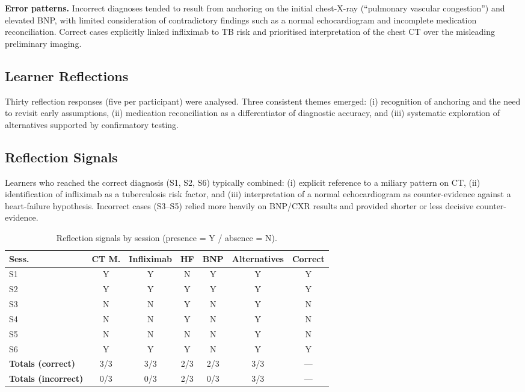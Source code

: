 \noindent
\textbf{Error patterns.}
Incorrect diagnoses tended to result from anchoring on the initial chest-X-ray
(``pulmonary vascular congestion'') and elevated BNP, with limited consideration of
contradictory findings such as a normal echocardiogram and incomplete medication
reconciliation.  
Correct cases explicitly linked infliximab to TB risk and prioritised interpretation of
the chest CT over the misleading preliminary imaging.

\subsection{Learner Reflections}

Thirty reflection responses (five per participant) were analysed.  
Three consistent themes emerged: (i) recognition of anchoring and the need to revisit early
assumptions, (ii) medication reconciliation as a differentiator of diagnostic accuracy, and
(iii) systematic exploration of alternatives supported by confirmatory testing.

\subsection{Reflection Signals}

Learners who reached the correct diagnosis (S1, S2, S6) typically combined:
(i) explicit reference to a miliary pattern on CT,
(ii) identification of infliximab as a tuberculosis risk factor,
and (iii) interpretation of a normal echocardiogram as counter-evidence against a
heart-failure hypothesis.  
Incorrect cases (S3–S5) relied more heavily on BNP/CXR results and provided shorter or less
decisive counter-evidence.

\begin{table}[h]
\centering
\caption{Reflection signals by session (presence = Y / absence = N).}
\label{tab:reflection_summary}
\setlength{\tabcolsep}{6pt}
\renewcommand{\arraystretch}{1.1}
\begin{tabular}{lccccc c}
\toprule
\textbf{Sess.} &
\textbf{CT M.} &
\textbf{Infliximab} &
\textbf{HF} &
\textbf{BNP} &
\textbf{Alternatives} &
\textbf{Correct} \\
\midrule
S1 & Y & Y & N & Y & Y & Y \\
S2 & Y & Y & Y & Y & Y & Y \\
S3 & N & N & Y & N & Y & N \\
S4 & N & N & Y & N & Y & N \\
S5 & N & N & N & N & Y & N \\
S6 & Y & Y & Y & N & Y & Y \\
\midrule
\textbf{Totals (correct)}   & 3/3 & 3/3 & 2/3 & 2/3 & 3/3 & --- \\
\textbf{Totals (incorrect)} & 0/3 & 0/3 & 2/3 & 0/3 & 3/3 & --- \\
\bottomrule
\end{tabular}
\end{table}

